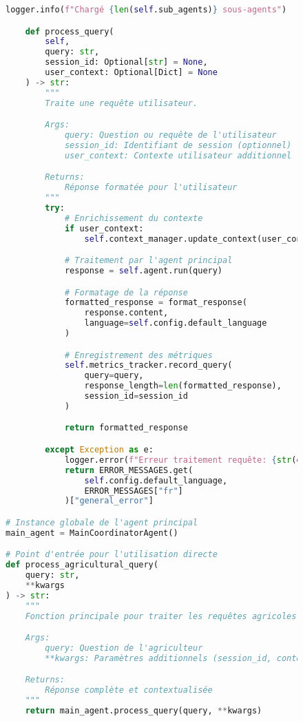 \begin{figure}[h]
\begin{lstlisting}[language=Python, caption=Structure complète de l'agent principal]
        logger.info(f"Chargé {len(self.sub_agents)} sous-agents")

    def process_query(
        self,
        query: str,
        session_id: Optional[str] = None,
        user_context: Optional[Dict] = None
    ) -> str:
        """
        Traite une requête utilisateur.

        Args:
            query: Question ou requête de l'utilisateur
            session_id: Identifiant de session (optionnel)
            user_context: Contexte utilisateur additionnel

        Returns:
            Réponse formatée pour l'utilisateur
        """
        try:
            # Enrichissement du contexte
            if user_context:
                self.context_manager.update_context(user_context)

            # Traitement par l'agent principal
            response = self.agent.run(query)

            # Formatage de la réponse
            formatted_response = format_response(
                response.content,
                language=self.config.default_language
            )

            # Enregistrement des métriques
            self.metrics_tracker.record_query(
                query=query,
                response_length=len(formatted_response),
                session_id=session_id
            )

            return formatted_response

        except Exception as e:
            logger.error(f"Erreur traitement requête: {str(e)}")
            return ERROR_MESSAGES.get(
                self.config.default_language,
                ERROR_MESSAGES["fr"]
            )["general_error"]

# Instance globale de l'agent principal
main_agent = MainCoordinatorAgent()

# Point d'entrée pour l'utilisation directe
def process_agricultural_query(
    query: str,
    **kwargs
) -> str:
    """
    Fonction principale pour traiter les requêtes agricoles.

    Args:
        query: Question de l'agriculteur
        **kwargs: Paramètres additionnels (session_id, context, etc.)

    Returns:
        Réponse complète et contextualisée
    """
    return main_agent.process_query(query, **kwargs)
\end{lstlisting}
\end{figure}

